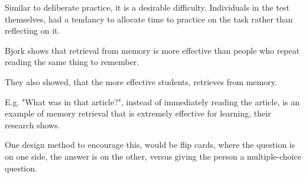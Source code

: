   Similar to deliberate practice, it is a desirable difficulty. Individuals in the test themselves, had a tendancy to allocate time to practice on the task rather than reflecting on it.


  Bjork \cite{bjork} shows that retrieval from memory is more effective than people who repeat reading the same thing to remember.

  They also showed, that the more effective students, retrieves from memory.

  E.g. "What was in that article?", instead of immediately reading the article, is an example of memory retrieval that is extremely effective for learning, their research shows.

  One design method to encourage this, would be flip cards, where the question is on one side, the answer is on the other, versus giving the person a multiple-choice question.



%
